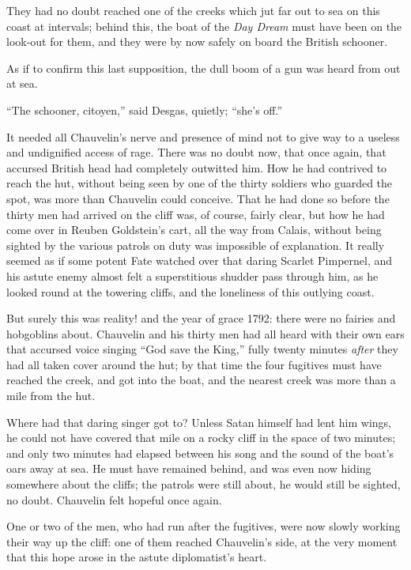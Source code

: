 They had no doubt reached one of the creeks which jut far out to sea on this coast at intervals; behind this, the boat of the \textit{Day Dream} must have been on the look-out for them, and they were by now safely on board the British schooner.

As if to confirm this last supposition, the dull boom of a gun was heard from out at sea.

\enquote{The schooner, citoyen,} said Desgas, quietly; \enquote{she's off.}

It needed all Chauvelin's nerve and presence of mind not to give way to a useless and undignified access of rage. There was no doubt now, that once again, that accursed British head had completely outwitted him. How he had contrived to reach the hut, without being seen by one of the thirty soldiers who guarded the spot, was more than Chauvelin could conceive. That he had done so before the thirty men had arrived on the cliff was, of course, fairly clear, but how he had come over in Reuben Goldstein's cart, all the way from Calais, without being sighted by the various patrols on duty was impossible of explanation. It really seemed as if some potent Fate watched over that daring Scarlet Pimpernel, and his astute enemy almost felt a superstitious shudder pass through him, as he looked round at the towering cliffs, and the loneliness of this outlying coast.

But surely this was reality! and the year of grace 1792: there were no fairies and hobgoblins about. Chauvelin and his thirty men had all heard with their own ears that accursed voice singing \enquote{God save the King,} fully twenty minutes \textit{after} they had all taken cover around the hut; by that time the four fugitives must have reached the creek, and got into the boat, and the nearest creek was more than a mile from the hut.

Where had that daring singer got to? Unless Satan himself had lent him wings, he could not have covered that mile on a rocky cliff in the space of two minutes; and only two minutes had elapsed between his song and the sound of the boat's oars away at sea. He must have remained behind, and was even now hiding somewhere about the cliffs; the patrols were still about, he would still be sighted, no doubt. Chauvelin felt hopeful once again.

One or two of the men, who had run after the fugitives, were now slowly working their way up the cliff: one of them reached Chauvelin's side, at the very moment that this hope arose in the astute diplomatist's heart.

